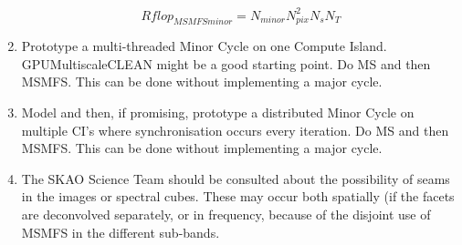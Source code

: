 \documentclass[11pt,a4paper,variablewidth]{article}
\begin{document}
\begin{enumerate}
\begin{equation}
Rflop_{MSMFSminor} = N_{minor} N_{pix}^2 N_s N_T	
\end{equation}
\item Prototype a multi-threaded Minor Cycle on one Compute Island. GPUMultiscaleCLEAN might be a good starting point. Do MS and then MSMFS. This can be done without implementing a major cycle.
\item Model and then, if promising, prototype a distributed Minor Cycle on multiple CI's where synchronisation occurs every iteration. Do MS and then MSMFS. This can be done without implementing a major cycle.
\item The SKAO Science Team should be consulted about the possibility of seams in the images or spectral cubes. These may occur both spatially (if the facets are deconvolved separately, or in frequency, because of the disjoint use of MSMFS in the different sub-bands.
\end{enumerate}






\clearpage {}
%
\end{document}

